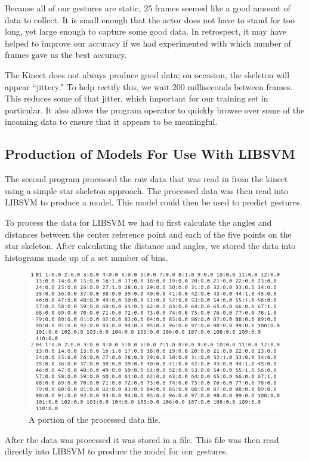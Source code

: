 \documentclass[11pt,conference]{IEEEtran}
\begin{document}
Because all of our gestures are static, 25 frames seemed like a good amount of data to collect. It is small enough that the actor does not have to stand for too long, yet large enough to capture some good data. In retrospect, it may have helped to improve our accuracy if we had experimented with which number of frames gave us the best accuracy.

The Kinect does not always produce good data; on occasion, the skeleton will appear ``jittery." To help rectify this, we wait 200 milliseconds between frames. This reduces some of that jitter, which important for our training set in particular. It also allows the program operator to quickly browse over some of the incoming data to ensure that it appears to be meaningful.

\subsection{Production of Models For Use With LIBSVM}
The second program processed the raw data that was read in from the kinect using a simple star skeleton approach. The processed data was then read into LIBSVM to produce a model. This model could then be used to predict gestures.

To process the data for LIBSVM we had to first calculate the angles and distances between the center reference point and each of the five points on the star skeleton. After calculating the distance and angles, we stored the data into histograms made up of a set number of bins.

\begin{figure}[h]
\caption{A portion of the processed data file.}
\centering
\includegraphics[width=\linewidth]{processed_data}
\end{figure}

After the data was processed it was stored in a file. This file was then read directly into LIBSVM to produce the model for our gestures. 
\end{document}

